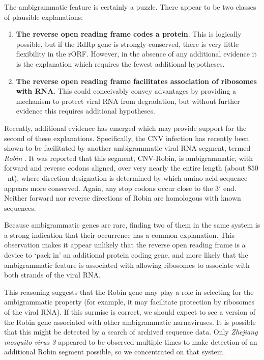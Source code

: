 \documentclass[unnumsec,webpdf,contemporary,large,namedate]{oup-authoring-template}%
\theoremstyle{thmstyleone}%
\theoremstyle{thmstyletwo}%
\theoremstyle{thmstylethree}%
\begin{document}
The ambigrammatic feature is certainly a puzzle. There appear to be two classes
of plausible explanations:

\begin{enumerate}

\item {\bf The reverse open reading frame codes a protein}. This is logically possible, but
if the RdRp gene is strongly conserved, there is very little flexibility in the rORF. However, in the
absence of any additional evidence it is the explanation which requires the fewest additional hypotheses.

\item {\bf The reverse open reading frame facilitates association of ribosomes with RNA}. This
could conceivably convey advantages by providing a mechanism to protect viral RNA from
degradation, but without further evidence this requires additional hypotheses.

\end{enumerate}

Recently, additional evidence has emerged which may provide support for the second of these explanations.
Specifically, the CNV infection has recently been shown to be facilitated by another ambigrammatic viral
RNA segment, termed \emph{Robin} \citep{Bat+20,Ret+20}. It was reported that this segment, CNV-Robin,
is ambigrammatic, with forward and reverse codons aligned, over very nearly
the entire length (about $850$~nt), where direction designation is determined by which amino acid sequence appears more conserved. Again, any stop codons occur close to the $3'$ end.
Neither forward nor reverse directions of Robin are homologous with known sequences.

Because ambigrammatic genes are rare, finding two of them in the same system is a strong
indication that their occurrence has a common explanation. This observation makes it
appear unlikely that the reverse open reading frame is a device to \lq pack in' an additional
protein coding gene, and more likely that the ambigrammatic feature is associated with
allowing ribosomes to associate with both strands of the viral RNA.

This reasoning suggests that the Robin gene may play a role in selecting for the
ambigrammatic property (for example, it may facilitate protection by ribosomes of the  viral RNA).
If this surmise is correct, we should expect to see a version of the Robin
gene associated with other ambigrammatic narnaviruses. It is possible that this might be detected
by a search of archived sequence data. Only \emph{Zhejiang mosquito virus 3} appeared to
be observed multiple times to make detection of an additional Robin segment possible, so we
concentrated on that system.
\end{document}
